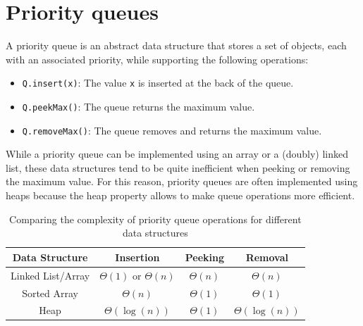 \documentclass{report}
\begin{document}
\section{Priority queues}
A priority queue is an abstract data structure that stores a set of objects, each with an associated priority, while supporting the following operations:
\begin{itemize}
    \item \texttt{Q.insert(x)}: The value \texttt{x} is inserted at the back of the queue.
    \item \texttt{Q.peekMax()}: The queue returns the maximum value.
    \item \texttt{Q.removeMax()}: The queue removes and returns the maximum value.
\end{itemize}
While a priority queue can be implemented using an array or a (doubly) linked list, these data structures tend to be quite inefficient when peeking or removing the maximum value. \newline
For this reason, priority queues are often implemented using heaps because the heap property allows to make queue operations more efficient.
\begin{table}[H]
    \centering
    \begin{tabular}{|c|c|c|c|}
        \hline
        \textbf{Data Structure} & \textbf{Insertion} & \textbf{Peeking} & \textbf{Removal} \\
        \hline
        Linked List/Array & $\displaystyle \Theta(1)$ or $\displaystyle \Theta(n)$ & $\displaystyle \Theta(n)$ & $\displaystyle \Theta(n)$ \\
        \hline
        Sorted Array & $\displaystyle \Theta(n)$ & $\displaystyle \Theta(1)$ & $\displaystyle \Theta(1)$ \\
        \hline
        Heap & $\displaystyle \Theta(\log(n))$ & $\displaystyle \Theta(1)$ & $\displaystyle \Theta(\log(n))$ \\
        \hline
    \end{tabular}
    \caption{Comparing the complexity of priority queue operations for different data structures}
    \label{tab:priority_queue_operations}
\end{table}
\end{document}
